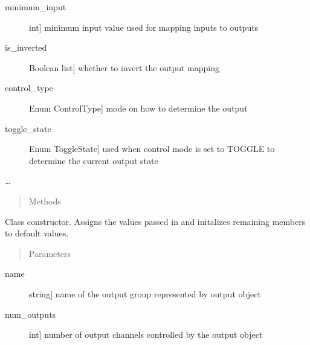 \documentclass[letterpaper,10pt,english]{sphinxmanual}
\begin{document}
\begin{fulllineitems}
\begin{description}
\item[{minimum\_input}] \leavevmode{[}int{]}
\sphinxAtStartPar
minimum input value used for mapping inputs to outputs

\item[{is\_inverted}] \leavevmode{[}Boolean list{]}
\sphinxAtStartPar
whether to invert the output mapping

\item[{control\_type}] \leavevmode{[}Enum ControlType{]}
\sphinxAtStartPar
mode on how to determine the output

\item[{toggle\_state}] \leavevmode{[}Enum ToggleState{]}
\sphinxAtStartPar
used when control mode is set to TOGGLE to determine the current output state

\end{description}

\sphinxAtStartPar
…
\begin{quote}\begin{description}
\item[{Methods}] \leavevmode
\end{description}\end{quote}

\begin{fulllineitems}
\label{\detokenize{generic:DigitalOutputObject.DigitalOutputObject.__init__}}
\sphinxAtStartPar
Class constructor. Assigns the values passed in and initalizes remaining members to default values.
\begin{quote}\begin{description}
\item[{Parameters}] \leavevmode
\end{description}\end{quote}
\begin{description}
\item[{name}] \leavevmode{[}string{]}
\sphinxAtStartPar
name of the output group represented by output object

\item[{num\_outputs}] \leavevmode{[}int{]}
\sphinxAtStartPar
number of output channels controlled by the output object


\end{description}
\end{fulllineitems}
\end{fulllineitems}
\end{document}

